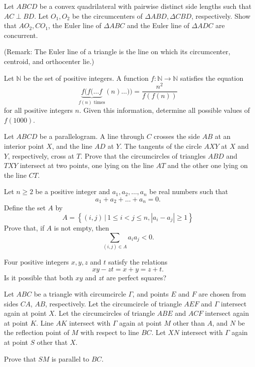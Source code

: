 \documentclass[11pt]{scrartcl}
\begin{document}
\begin{problem}[8963205841174892420]
	Let $ABCD$ be a convex quadrilateral with pairwise distinct side lengths such that $AC\perp BD$. Let $O_1,O_2$ be the circumcenters of $\Delta ABD, \Delta CBD$, respectively. Show that $AO_2, CO_1$, the Euler line of $\Delta ABC$ and the Euler line of $\Delta ADC$ are concurrent.

(Remark: The Euler line of a triangle is the line on which its circumcenter, centroid, and orthocenter lie.)
\end{problem}
\begin{problem}[18644549011438]
Let $\mathbb{N}$ be the set of positive integers. A function $f:\mathbb{N}\to\mathbb{N}$ satisfies the equation\[\underbrace{f(f(\ldots f}_{f(n)\text{ times}}(n)\ldots))=\frac{n^2}{f(f(n))}\]for all positive integers $n$. Given this information, determine all possible values of $f(1000)$.
\end{problem}
\begin{problem}[579228243242060]
Let $ABCD$ be a parallelogram. A line through $C$ crosses the side $AB$ at an interior point $X$,
and the line $AD$ at $Y$. The tangents of the circle $AXY$ at $X$ and $Y$, respectively, cross at $T$.
Prove that the circumcircles of triangles $ABD$ and $TXY$ intersect at two points, one lying on the line $AT$ and the other one lying on the line $CT$.
\end{problem}
\begin{problem}[781756252908608]
Let $n\geqslant 2$ be a positive integer and $a_1,a_2, \ldots ,a_n$ be real numbers such that\[a_1+a_2+\dots+a_n=0.\]Define the set $A$ by
\[A=\left\{(i, j)\,|\,1 \leqslant i<j \leqslant n,\left|a_{i}-a_{j}\right| \geqslant 1\right\}\]Prove that, if $A$ is not empty, then
\[\sum_{(i, j) \in A} a_{i} a_{j}<0.\]
\end{problem}
\begin{problem}[4678973565823282552]
Four positive integers $x,y,z$ and $t$ satisfy the relations
\[ xy - zt = x + y = z + t. \]Is it possible that both $xy$ and $zt$ are perfect squares?
\end{problem}
\begin{problem}[5897111412933990257]
Let $ABC$ be a triangle with circumcircle $\Gamma$, and points $E$ and $F$ are chosen from sides $CA$, $AB$, respectively. Let the circumcircle of triangle $AEF$ and $\Gamma$ intersect again at point $X$. Let the circumcircles of triangle $ABE$ and $ACF$ intersect again at point $K$. Line $AK$ intersect with $\Gamma$ again at point $M$ other than $A$, and $N$ be the reflection point of $M$ with respect to line $BC$. Let $XN$ intersect with $\Gamma$ again at point $S$ other that $X$.

Prove that $SM$ is parallel to $BC$.
\end{problem}
\end{document}
